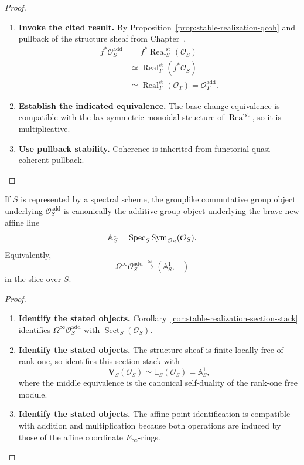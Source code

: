 \begin{proof}
\leavevmode
\begin{enumerate}[label=\textup{(\arabic*)}]
    \item \textbf{Invoke the cited result.}
    By Proposition~\ref{prop:stable-realization-qcoh} and pullback of the structure
    sheaf from Chapter~,
    \[
    \begin{aligned}
    f^*\mathcal O_S^{\mathrm{add}}
    &=f^*\operatorname{Real}^{\mathrm{st}}_S(\mathcal O_S)\\
    &\simeq\operatorname{Real}^{\mathrm{st}}_T(f^*\mathcal O_S)\\
    &\simeq\operatorname{Real}^{\mathrm{st}}_T(\mathcal O_T)
    =\mathcal O_T^{\mathrm{add}}.
    \end{aligned}
    \]
    \item \textbf{Establish the indicated equivalence.}
    The base-change equivalence is compatible with the lax symmetric monoidal structure
    of \(\operatorname{Real}^{\mathrm{st}}\), so it is multiplicative.
    \item \textbf{Use pullback stability.}
    Coherence is inherited from
    functorial quasi-coherent pullback.
\end{enumerate}
\end{proof}

\begin{proposition}
\label{prop:additive-scalar-affine-line-recognition}
If \(S\) is represented by a spectral scheme, the grouplike commutative group
object underlying \(\mathcal O_S^{\mathrm{add}}\) is canonically the additive
group object underlying the brave new affine line
\[
  \mathbb A^1_S
  =
  \operatorname{Spec}_S\operatorname{Sym}_{\mathcal O_S}(\mathcal O_S).
\]
Equivalently,
\[
  \Omega^\infty\mathcal O_S^{\mathrm{add}}
  \xrightarrow{\simeq}
  (\mathbb A^1_S,+)
\]
in the slice over \(S\).
\end{proposition}

\begin{proof}
\leavevmode
\begin{enumerate}[label=\textup{(\arabic*)}]
    \item \textbf{Identify the stated objects.}
    Corollary~\ref{cor:stable-realization-section-stack} identifies
    \(\Omega^\infty\mathcal O_S^{\mathrm{add}}\) with
    \(\operatorname{Sect}_S(\mathcal O_S)\).
    \item \textbf{Identify the stated objects.}
    The structure sheaf is finite locally
    free of rank one, so
     identifies this section stack with
    \[
    \mathbf V_S(\mathcal O_S)
    \simeq
    \mathbb L_S(\mathcal O_S)
    =
    \mathbb A^1_S,
    \]
    where the middle equivalence is the canonical self-duality of the rank-one free
    module.
    \item \textbf{Identify the stated objects.}
    The affine-point identification is compatible with addition and
    multiplication because both operations are induced by those of the affine
    coordinate \(E_\infty\)-rings.
\end{enumerate}
\end{proof}



